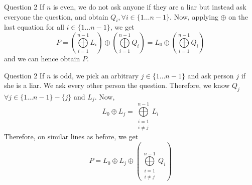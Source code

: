 \documentclass{beamer}
\begin{document}
{\begin{frame}{Question 2}
            If $n$ is even, we do not ask anyone if they are a liar but instead ask everyone the question, and obtain $Q_{i}, \forall i \in \{1 \dots n - 1\}$.
            Now, applying $\oplus$ on the last equation for all $i \in \{1 \dots n - 1\}$, we get
            \begin{equation*}
                P = \left(\bigoplus\limits_{i = 1}^{n - 1} L_{i}\right) \oplus \left(\bigoplus\limits_{i = 1}^{n - 1} Q_{i}\right) = L_{0} \oplus \left(\bigoplus\limits_{i = 1}^{n - 1} Q_{i}\right)
            \end{equation*}
            and we can hence obtain $P$.
        \end{frame}
        \begin{frame}{Question 2}
            If $n$ is odd, we pick an arbitrary $j \in \{1 \dots n - 1\}$ and ask person $j$ if she is a liar. We ask every other person the question. Therefore, we know $Q_{j}$ $\forall j \in \{1 \dots n - 1\} - \{j\}$ and $L_{j}$.
            Now,
            \begin{equation*}
                L_{0} \oplus L_{j} = \bigoplus\limits_{\substack{i = 1\\i \neq j}}^{n - 1} L_{i}
            \end{equation*}
            Therefore, on similar lines as before, we get
            \begin{equation*}
                P = L_{0} \oplus L_{j} \oplus \left(\bigoplus\limits_{\substack{i = 1\\i \neq j}}^{n - 1} Q_{i}\right)
            \end{equation*}
        \end{frame}
    }
\end{document}

